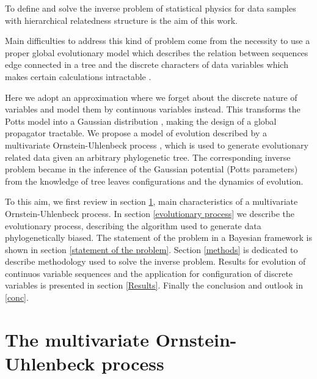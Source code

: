 \documentclass[preprint,amsmath,amssymb,superscriptaddress,showpacs,pre]{revtex4-1}
\begin{document}
 To define and solve the inverse problem of statistical physics for data samples with hierarchical  relatedness structure is the aim of this work. 

Main difficulties to address  this kind of problem  come from the necessity to use  a proper global evolutionary model which describes the relation between sequences edge connected in a tree and the discrete  characters of data variables which makes certain calculations intractable \cite{entropy_paper}. 

Here we  adopt an approximation where we forget about the discrete nature of variables and model them by continuous variables instead. This transforms the Potts model into a Gaussian distribution \cite{Baldassi}, making the design of a global propagator tractable. We propose a model of evolution described by a multivariate Ornstein-Uhlenbeck process \cite{gardiner}, which is used  to generate evolutionary related data given an arbitrary phylogenetic tree. The corresponding inverse problem became in the inference of the Gaussian potential (Potts parameters) from the knowledge of tree leaves configurations and the dynamics of evolution. 

To this aim, we first review in section \ref{sec:ornstein_uhlenbeck_dynamics}, main characteristics of a multivariate Ornstein-Uhlenbeck process. In section \ref{evolutionary process} we describe the evolutionary process, describing the algorithm used to generate data phylogenetically biased. The statement of the problem in a Bayesian framework is shown in section \ref{statement of the problem}. Section \ref{methods} is dedicated to describe methodology used to solve the inverse problem. Results for evolution of continuos variable sequences and  the application for configuration of discrete variables is presented in section \ref{Results}. Finally the conclusion and outlook in \ref{conc}.


\section{The multivariate Ornstein-Uhlenbeck process}
\label{sec:ornstein_uhlenbeck_dynamics}
\end{document}
